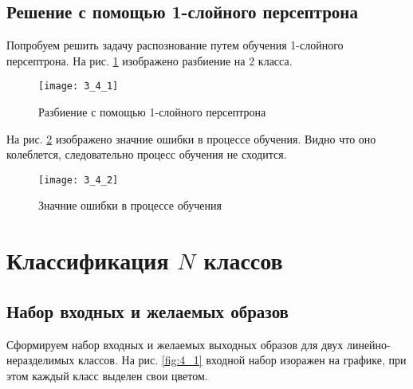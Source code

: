 \subsection{Решение с помощью 1-слойного персептрона}


Попробуем решить задачу распознование путем обучения 1-слойного персептрона. На рис. \ref{fig:3_4_1} изображено разбиение на 2 класса.

\begin{figure}[H]
\begin{center}
	\texttt{[image: 3\_4\_1]}
	\caption{Разбиение с помощью 1-слойного персептрона}
	\label{fig:3_4_1}
\end{center}
\end{figure}

На рис. \ref{fig:3_4_2} изображено значние ошибки в процессе обучения. Видно что оно колеблется, следовательно процесс обучения не сходится.

\begin{figure}[H]
\begin{center}
	\texttt{[image: 3\_4\_2]}
	\caption{Значние ошибки в процессе обучения}
	\label{fig:3_4_2}
\end{center}
\end{figure}



\section{Классификация $N$ классов}

\subsection{Набор входных и желаемых образов}

Сформируем набор входных и желаемых выходных образов для двух линейно-неразделимых классов. На рис. \ref{fig:4_1} входной набор изоражен на графике, при этом каждый класс выделен свои цветом.

